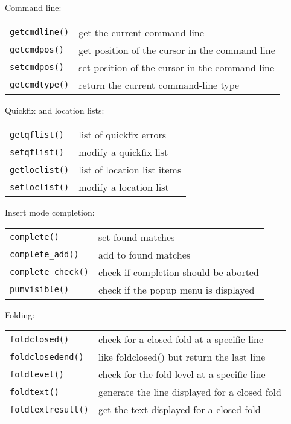 Command line:
\label{command-line-functions}
\begin{center} \begin{tabular}{l l}
				\texttt{getcmdline()} & get the current command line \\
				\texttt{getcmdpos()} & get position of the cursor in the command line \\
				\texttt{setcmdpos()} & set position of the cursor in the command line \\
				\texttt{getcmdtype()} & return the current command-line type \\
\end{tabular} \end{center}

Quickfix and location lists:
\label{quickfix-functions}
\begin{center} \begin{tabular}{l l}
				\texttt{getqflist()} & list of quickfix errors \\
				\texttt{setqflist()} & modify a quickfix list \\
				\texttt{getloclist()} & list of location list items \\
				\texttt{setloclist()} & modify a location list \\
\end{tabular} \end{center}

Insert mode completion:
\label{completion-functions}
\begin{center} \begin{tabular}{l l}
				\texttt{complete()} & set found matches \\
				\texttt{complete\_add()} & add to found matches \\
				\texttt{complete\_check()} & check if completion should be aborted \\
				\texttt{pumvisible()} & check if the popup menu is displayed \\
\end{tabular} \end{center}

Folding:
\label{folding-functions}
\begin{center} \begin{tabular}{l l}
				\texttt{foldclosed()} & check for a closed fold at a specific line \\
				\texttt{foldclosedend()} & like foldclosed() but return the last line \\
				\texttt{foldlevel()} & check for the fold level at a specific line \\
				\texttt{foldtext()} & generate the line displayed for a closed fold \\
				\texttt{foldtextresult()} & get the text displayed for a closed fold \\
\end{tabular} \end{center}

